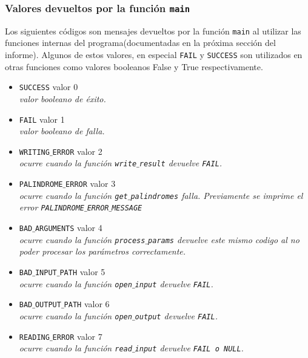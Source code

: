 \documentclass[a4paper, 10pt]{article}
\def\code#1{\texttt{#1}}
\begin{document}
		\subsubsection{Valores devueltos por la función \code{main}}
			Los siguientes códigos son mensajes devueltos por la función \code{main} al utilizar las funciones
			internas del programa(documentadas en la próxima sección del informe). Algunos de estos valores,
			en especial \code{FAIL} y \code{SUCCESS} son utilizados en otras funciones como valores booleanos
			False y True respectivamente.
			\begin{itemize}
				\item \code{SUCCESS} valor 0
					\\\textit{valor booleano de éxito.}
				\item \code{FAIL} valor 1
					\\\textit{valor booleano de falla.}
				\item \code{WRITING$\_$ERROR} valor 2
					\\\textit{ocurre cuando la función \code{write$\_$result} devuelve \code{FAIL}.}
				\item \code{PALINDROME$\_$ERROR} valor 3
					\\\textit{ocurre cuando la función \code{get$\_$palindromes} falla. Previamente se
					imprime el error \code{PALINDROME$\_$ERROR$\_$MESSAGE}}
				\item \code{BAD$\_$ARGUMENTS} valor 4
					\\\textit{ocurre cuando la función \code{process$\_$params} devuelve este mismo
					codigo al no poder procesar los parámetros correctamente.}
				\item \code{BAD$\_$INPUT$\_$PATH} valor 5
					\\\textit{ocurre cuando la función \code{open$\_$input} devuelve \code{FAIL}.}
				\item \code{BAD$\_$OUTPUT$\_$PATH} valor 6
					\\\textit{ocurre cuando la función \code{open$\_$output} devuelve \code{FAIL}.}
				\item \code{READING$\_$ERROR} valor 7
					\\\textit{ocurre cuando la función \code{read$\_$input} devuelve \code{FAIL o NULL}.}
			\end{itemize}
\end{document}
